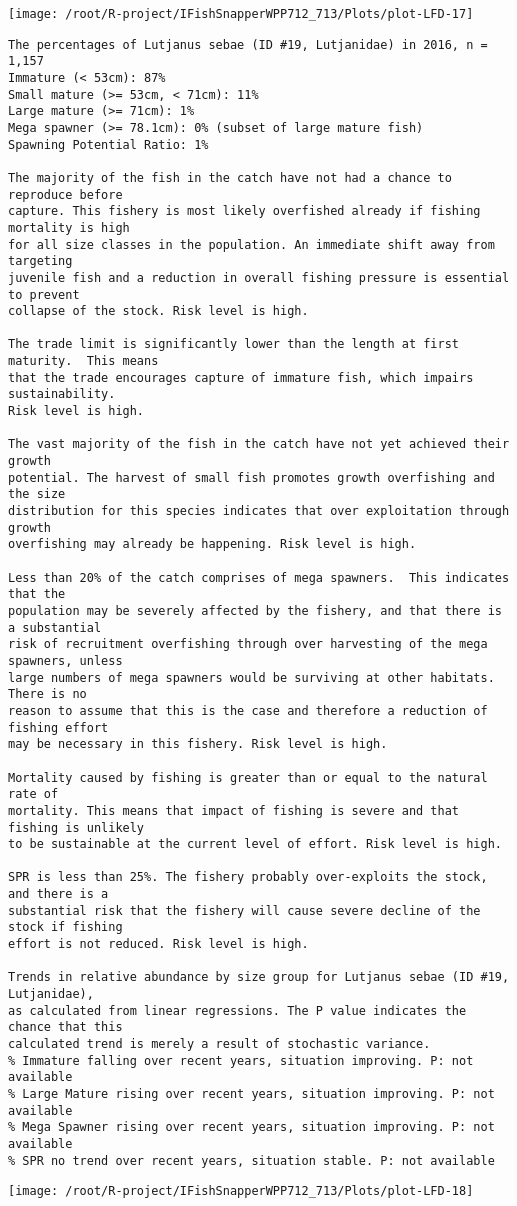 \documentclass{report}\usepackage[]{graphicx}\usepackage[]{color}
\makeatletter
\def\maxwidth{ %
  \ifdim\Gin@nat@width>\linewidth
    \linewidth
  \else
    \Gin@nat@width
  \fi
}
\newenvironment{kframe}{%
 \def\at@end@of@kframe{}%
 \ifinner\ifhmode%
  \def\at@end@of@kframe{\end{minipage}}%
  \begin{minipage}{\columnwidth}%
 \fi\fi%
 \def\FrameCommand##1{\hskip\@totalleftmargin \hskip-\fboxsep
 \colorbox{shadecolor}{##1}\hskip-\fboxsep
     \hskip-\linewidth \hskip-\@totalleftmargin \hskip\columnwidth}%
 \MakeFramed {\advance\hsize-\width
   \@totalleftmargin\z@ \linewidth\hsize
   \@setminipage}}%
 {\par\unskip\endMakeFramed%
 \at@end@of@kframe}
\newenvironment{knitrout}{}{} %
\makeatother
\begin{document}
\begin{knitrout}
\texttt{[image: /root/R-project/IFishSnapperWPP712\_713/Plots/plot-LFD-17]} 
\begin{kframe}\begin{verbatim}
The percentages of Lutjanus sebae (ID #19, Lutjanidae) in 2016, n = 1,157
Immature (< 53cm): 87%
Small mature (>= 53cm, < 71cm): 11%
Large mature (>= 71cm): 1%
Mega spawner (>= 78.1cm): 0% (subset of large mature fish)
Spawning Potential Ratio: 1%
 
The majority of the fish in the catch have not had a chance to reproduce before
capture. This fishery is most likely overfished already if fishing mortality is high
for all size classes in the population. An immediate shift away from targeting
juvenile fish and a reduction in overall fishing pressure is essential to prevent
collapse of the stock. Risk level is high.

The trade limit is significantly lower than the length at first maturity.  This means
that the trade encourages capture of immature fish, which impairs sustainability.
Risk level is high.

The vast majority of the fish in the catch have not yet achieved their growth
potential. The harvest of small fish promotes growth overfishing and the size
distribution for this species indicates that over exploitation through growth
overfishing may already be happening. Risk level is high.

Less than 20% of the catch comprises of mega spawners.  This indicates that the
population may be severely affected by the fishery, and that there is a substantial
risk of recruitment overfishing through over harvesting of the mega spawners, unless
large numbers of mega spawners would be surviving at other habitats. There is no
reason to assume that this is the case and therefore a reduction of fishing effort
may be necessary in this fishery. Risk level is high.
 
Mortality caused by fishing is greater than or equal to the natural rate of
mortality. This means that impact of fishing is severe and that fishing is unlikely
to be sustainable at the current level of effort. Risk level is high.
 
SPR is less than 25%. The fishery probably over-exploits the stock, and there is a
substantial risk that the fishery will cause severe decline of the stock if fishing
effort is not reduced. Risk level is high.
 
Trends in relative abundance by size group for Lutjanus sebae (ID #19, Lutjanidae),
as calculated from linear regressions. The P value indicates the chance that this
calculated trend is merely a result of stochastic variance.
% Immature falling over recent years, situation improving. P: not available
% Large Mature rising over recent years, situation improving. P: not available
% Mega Spawner rising over recent years, situation improving. P: not available
% SPR no trend over recent years, situation stable. P: not available
\end{verbatim}
\end{kframe}
\texttt{[image: /root/R-project/IFishSnapperWPP712\_713/Plots/plot-LFD-18]} 


\end{knitrout}
\end{document}
